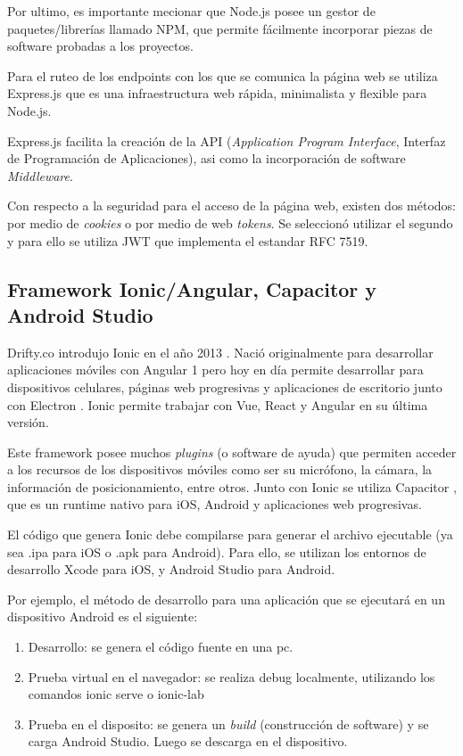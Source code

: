 Por ultimo, es importante mecionar que Node.js posee un gestor de paquetes/librerías llamado NPM, que permite fácilmente incorporar piezas de software probadas a los proyectos.


Para el ruteo de los endpoints con los que se comunica la página web se utiliza Express.js \citep{WEBSITE:21} que es una infraestructura web rápida, minimalista y flexible para Node.js. 

Express.js facilita la creación de la API (\textit{Application Program Interface}, Interfaz de Programación de Aplicaciones), asi como la incorporación de software \textit{Middleware}. 

Con respecto a la seguridad para el acceso de la página web, existen dos métodos: por medio de \textit{cookies} o por medio de web \textit{tokens}. Se seleccionó utilizar el segundo y para ello se utiliza JWT \citep{WEBSITE:22} que implementa el estandar RFC 7519. 



\subsection{Framework Ionic/Angular, Capacitor y Android Studio}
\label{subsec: Ionic}

Drifty.co introdujo Ionic en el año 2013 \citep{WEBSITE:24}. Nació originalmente para desarrollar aplicaciones móviles con Angular 1 pero hoy en día permite desarrollar para dispositivos celulares, páginas web progresivas y aplicaciones de escritorio junto con Electron \citep{WEBSITE:25}. Ionic permite trabajar con Vue, React y Angular en su última versión.

Este framework posee muchos \textit{plugins} (o software de ayuda) que permiten acceder a los recursos de los dispositivos móviles como ser su micrófono, la cámara, la información de posicionamiento, entre otros. Junto con Ionic se utiliza Capacitor \citep{WEBSITE:26}, que es un runtime nativo para iOS, Android y aplicaciones web progresivas.

El código que genera Ionic debe compilarse para generar el archivo ejecutable (ya sea .ipa para iOS o .apk para Android). Para ello, se utilizan los entornos de desarrollo Xcode para iOS, y Android Studio para Android.

Por ejemplo, el método de desarrollo para una aplicación que se ejecutará en un dispositivo Android es el siguiente:

\begin{enumerate}
\item Desarrollo: se genera el código fuente en una pc.
\item Prueba virtual en el navegador:  se realiza debug localmente, utilizando los comandos ionic serve o ionic-lab
\item Prueba en el disposito: se genera un \textit{build} (construcción de software) y se carga Android Studio. Luego se descarga en el dispositivo.
\end{enumerate}
